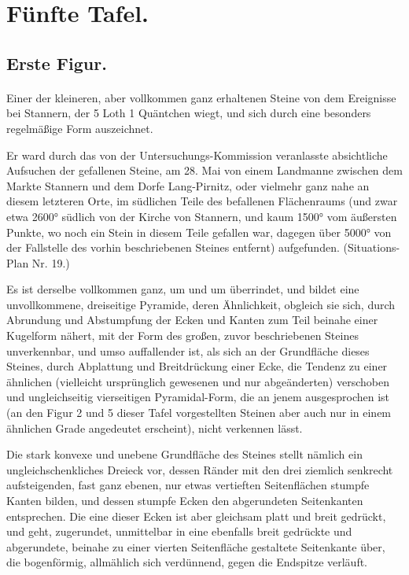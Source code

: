 \documentclass[a4paper, 11pt, oneside, german]{article}
\begin{document}
\section{Fünfte Tafel.}
\subsection{Erste Figur.}
\paragraph{}
Einer der kleineren, aber vollkommen ganz erhaltenen Steine von dem Ereignisse bei Stannern, der 5 Loth 1 Quäntchen wiegt, und sich durch eine besonders regelmäßige Form auszeichnet.

Er ward durch das von der Untersuchungs-Kommission veranlasste absichtliche Aufsuchen der gefallenen Steine, am 28. Mai von einem Landmanne zwischen dem Markte Stannern und dem Dorfe Lang-Pirnitz, oder vielmehr ganz nahe an diesem letzteren Orte, im südlichen Teile des befallenen Flächenraums (und zwar etwa 2600° südlich von der Kirche von Stannern, und kaum 1500° vom äußersten Punkte, wo noch ein Stein in diesem Teile gefallen war, dagegen über 5000° von der Fallstelle des vorhin beschriebenen Steines entfernt) aufgefunden. (Situations-Plan Nr. 19.)

Es ist derselbe vollkommen ganz, um und um überrindet, und bildet eine unvollkommene, dreiseitige Pyramide, deren Ähnlichkeit, obgleich sie sich, durch Abrundung und Abstumpfung der Ecken und Kanten zum Teil beinahe einer Kugelform nähert, mit der Form des großen, zuvor beschriebenen Steines unverkennbar, und umso auffallender ist, als sich an der Grundfläche dieses Steines, durch Abplattung und Breitdrückung einer Ecke, die Tendenz zu einer ähnlichen (vielleicht ursprünglich gewesenen und nur abgeänderten) verschoben und ungleichseitig vierseitigen Pyramidal-Form, die an jenem ausgesprochen ist (an den Figur 2 und 5 dieser Tafel vorgestellten Steinen aber auch nur in einem ähnlichen Grade angedeutet erscheint), nicht verkennen lässt.

Die stark konvexe und unebene Grundfläche des Steines stellt nämlich ein ungleichschenkliches Dreieck vor, dessen Ränder mit den drei ziemlich senkrecht aufsteigenden, fast ganz ebenen, nur etwas vertieften Seitenflächen stumpfe Kanten bilden, und dessen stumpfe Ecken den abgerundeten Seitenkanten entsprechen. Die eine dieser Ecken ist aber gleichsam platt und breit gedrückt, und geht, zugerundet, unmittelbar in eine ebenfalls breit gedrückte und abgerundete, beinahe zu einer vierten Seitenfläche gestaltete Seitenkante über, die bogenförmig, allmählich sich verdünnend, gegen die Endspitze verläuft.
\end{document}

